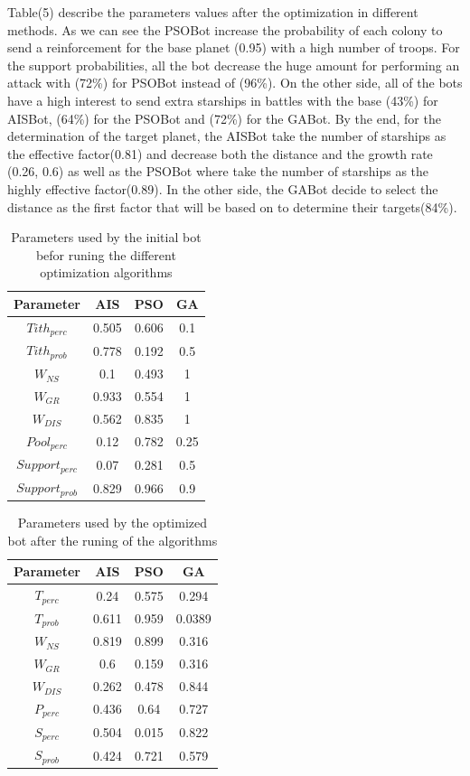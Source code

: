 \documentclass[]{interact}
\theoremstyle{plain}%
\theoremstyle{definition}
\theoremstyle{remark}
\begin{document}
Table(5) describe the parameters values after the optimization in different methods. As we can see the PSOBot increase the probability of each colony to send a reinforcement for the base planet (0.95) with a high number of troops. For the support probabilities, all the bot decrease the huge amount for performing an attack with (72\%) for PSOBot instead of (96\%). On the other side, all of the bots have a high interest to send extra starships in battles with the base (43\%) for AISBot, (64\%) for the PSOBot and (72\%) for the GABot. By the end, for the determination of the target planet, the AISBot take the number of starships as the effective factor(0.81) and decrease both the distance and the growth rate (0.26, 0.6)  as well as the PSOBot where take the number of starships as the highly effective factor(0.89). In the other side, the GABot decide to select the distance as the first factor that will be based on to determine their targets(84\%). \\

\begin{table}
\centering
\begin{tabular}{|c|c|c|c|}
\hline
 Parameter & AIS & PSO & GA \\ 
 \hline
 $Tith_{perc}$ & 0.505 & 0.606 & 0.1\\  
 \hline
 $Tith_{prob}$ & 0.778 & 0.192 & 0.5\\
 \hline
 $W_{NS}$ & 0.1 & 0.493 & 1\\
 \hline
 $W_{GR}$ & 0.933 & 0.554 & 1\\
 \hline
 $W_{DIS}$ & 0.562 & 0.835 & 1\\
 \hline
 $Pool_{perc}$ & 0.12 & 0.782 & 0.25\\
 \hline
 $Support_{perc}$ & 0.07 & 0.281 & 0.5\\
 \hline
 $Support_{prob}$ & 0.829 & 0.966 & 0.9\\
 \hline  
\end{tabular}
\caption{Parameters used by the initial bot befor runing the different optimization algorithms}
\label{TABLE 4}
\end{table}

\begin{table}
\centering
\begin{tabular}{|c|c|c|c|}
\hline
 Parameter & AIS & PSO & GA \\ 
 \hline
 $T_{perc}$ & 0.24 & 0.575 & 0.294\\  
 \hline
 $T_{prob}$ & 0.611 & 0.959 & 0.0389\\
 \hline
 $W_{NS}$ & 0.819 & 0.899 & 0.316\\
 \hline
 $W_{GR}$ & 0.6 & 0.159 & 0.316\\
 \hline
 $W_{DIS}$ & 0.262 & 0.478 & 0.844\\
 \hline
 $P_{perc}$ & 0.436 & 0.64 & 0.727\\
 \hline
 $S_{perc}$ & 0.504 & 0.015 & 0.822\\
 \hline
 $S_{prob}$ & 0.424 & 0.721 & 0.579\\
 \hline  
\end{tabular}
\caption{Parameters used by the optimized bot after the runing of the algorithms}
\label{TABLE 4}
\end{table}
\end{document}
